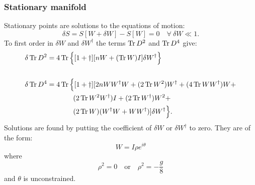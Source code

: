 \subsubsection{Stationary manifold}
Stationary points are solutions to the equations of motion:
\begin{equation}
\delta S = S[W + \delta W] - S[W] = 0 \quad  \forall \ \delta W \ll 1.
\end{equation}
To first order in $\delta W$ and $\delta W^\dagger$ the terms $\operatorname{Tr} D^2$ and $\operatorname{Tr} D^4$ give:
\begin{align}
\delta \operatorname{Tr} D^2 &= 4 \operatorname{Tr} \Big\{ [1+ \dagger] [ n W + (\operatorname{Tr} W) I ] \delta W^\dagger \Big\} \\
\notag \\
\delta \operatorname{Tr} D^4 &= 4 \operatorname{Tr} \Big\{ [1+ \dagger] [2n W W^\dagger W  + (2 \operatorname{Tr} W^2) W^\dagger  + (4 \operatorname{Tr} W W^\dagger) W + \notag \\
&\phantom{aaaaaaa} (2 \operatorname{Tr} W^2 W^\dagger) I + (2 \operatorname{Tr} W^\dagger) W^2 + \notag \\ 
&\phantom{aaaaaaa}(2 \operatorname{Tr} W) ( W^\dagger W + W W^\dagger )] \delta W^\dagger \Big\}.
\end{align}
Solutions are found by putting the coefficient of $\delta W$ or $\delta W^\dagger$ to zero. They are of the form:
\begin{equation}
W = I \rho e^{i \theta}
\end{equation}
where
\begin{equation}
\rho^2 = 0 \quad \text{or} \quad \rho^2 = -\frac{g}{8}
\end{equation}
and $\theta$ is unconstrained.
